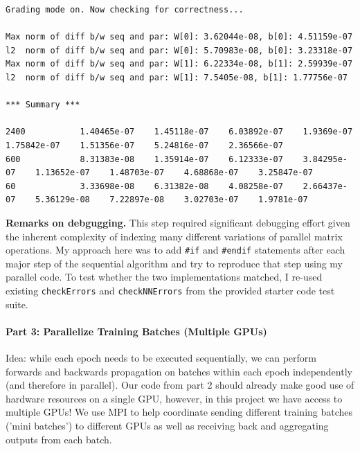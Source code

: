 \documentclass[12pt,letterpaper,twoside]{article}
\begin{document}
\begin{verbatim}
Grading mode on. Now checking for correctness...

Max norm of diff b/w seq and par: W[0]: 3.62044e-08, b[0]: 4.51159e-07
l2  norm of diff b/w seq and par: W[0]: 5.70983e-08, b[0]: 3.23318e-07
Max norm of diff b/w seq and par: W[1]: 6.22334e-08, b[1]: 2.59939e-07
l2  norm of diff b/w seq and par: W[1]: 7.5405e-08, b[1]: 1.77756e-07

*** Summary ***

2400           1.40465e-07    1.45118e-07    6.03892e-07    1.9369e-07     1.75842e-07    1.51356e-07    5.24816e-07    2.36566e-07    
600            8.31383e-08    1.35914e-07    6.12333e-07    3.84295e-07    1.13652e-07    1.48703e-07    4.68868e-07    3.25847e-07    
60             3.33698e-08    6.31382e-08    4.08258e-07    2.66437e-07    5.36129e-08    7.22897e-08    3.02703e-07    1.9781e-07     

\end{verbatim}

\textbf{Remarks on debgugging.} This step required significant debugging effort given 
the inherent complexity of indexing many different variations of parallel matrix 
operations. My approach here was to add \texttt{\#if} and \texttt{\#endif} statements 
after each major step of the sequential algorithm and try to reproduce that step using 
my parallel code. To test whether the two implementations matched, I re-used existing 
\texttt{checkErrors} and \texttt{checkNNErrors} from the provided starter code test suite.


\paragraph{Part 3: Parallelize Training Batches (Multiple GPUs)} Idea: while each epoch 
needs to be executed sequentially, we can perform forwards and backwards propagation on 
batches within each epoch independently (and therefore in parallel). Our code from part 
2 should already make good use of hardware resources on a single GPU, however, in this 
project we have access to multiple GPUs! We use MPI to help coordinate sending different
training batches ('mini batches') to different GPUs as well as receiving back and 
aggregating outputs from each batch.
\end{document}
